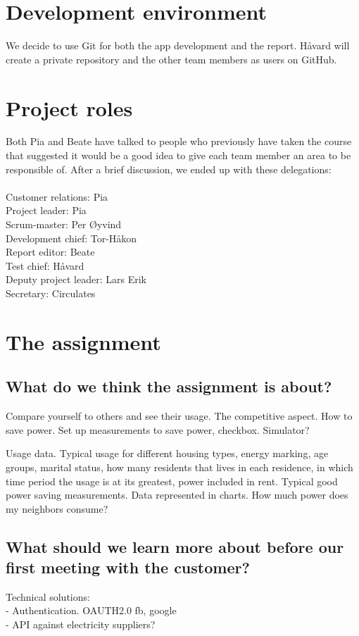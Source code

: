 \documentclass[12pt]{article}
\begin{document}
\section{Development environment}
We decide to use Git for both the app development and the report. Håvard will create a private repository and the other team members as users on GitHub.


\section{Project roles}
Both Pia and Beate have talked to people who previously have taken the course that suggested it would be a good idea to give each team member an area to be responsible of. After a brief discussion, we ended up with these delegations:\\\\
Customer relations: Pia\\
Project leader: Pia\\
Scrum-master: Per Øyvind\\
Development chief: Tor-Håkon\\
Report editor: Beate\\
Test chief: Håvard\\
Deputy project leader: Lars Erik\\
Secretary: Circulates


\section{The assignment}
\subsection{What do we think the assignment is about?}
Compare yourself to others and see their usage. The competitive aspect. How to save power. Set up measurements to save power, checkbox. Simulator?

Usage data. Typical usage for different housing types, energy marking, age groups, marital status, how many residents that lives in each residence, in which time period the usage is at its greatest, power included in rent. Typical good power saving measurements. Data represented in charts. How much power does my neighbors consume?

\subsection{What should we learn more about before our first meeting with the customer?}
Technical solutions:\\
- Authentication. OAUTH2.0 fb, google\\
- API against electricity suppliers?
\end{document}
